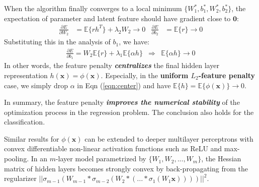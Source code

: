 When the algorithm finally converges to a local minimum $\{W_1^*,b_1^*,W_2^*,b_2^*\}$, the expectation of parameter and latent feature should have gradient close to $\mathbf{0}$:
\begin{align*}
\frac{\partial E}{\partial W_2}&=\mathbb{E}\{rh^T\}+\lambda_2W_2\rightarrow0 &
\frac{\partial E}{\partial b_2}&=\mathbb{E}\{r\}\rightarrow0
\end{align*}
Substituting this in the analysis of $b_1$, we have:
\begin{eqnarray}
\frac{\partial E}{\partial b_1}=W_2\mathbb{E}\{r\}+\lambda_1 \mathbb{E}\{\alpha h\}&\Longrightarrow& \mathbb{E}\{\alpha h\}\rightarrow0
\label{eqn:center}
\end{eqnarray}
In other words, the feature penalty \textit{\textbf{centralizes}} the {\color{red}final hidden layer} representation $h(\mathbf{x})=\phi(\mathbf{x})$. Especially, in the \textbf{uniform $L_2$-feature penalty} case, we simply drop $\alpha$ in Eqn (\ref{eqn:center}) and have $\mathbb{E}\{h\}=\mathbb{E}\{\phi(\mathbf{x})\}\rightarrow0$. 

In summary, the feature penalty \textit{\textbf{improves the numerical stability}} of the optimization process in the regression problem. The conclusion also holds for the classification.

{\color{red}Similar results for $\phi(\mathbf{x})$ can be extended to deeper multilayer perceptrons with convex differentiable non-linear activation functions such as ReLU and max-pooling. In an $m$-layer model parametrized by $\{W_1,W_2,...,W_m\}$, the Hessian matrix of hidden layers becomes strongly convex by back-propagating from the regularizer $||\sigma_{m-1}(W_{m-1}*\sigma_{m-2}(W_2*(...*\sigma_{1}(W_1\mathbf{x}))))||^2$.} %